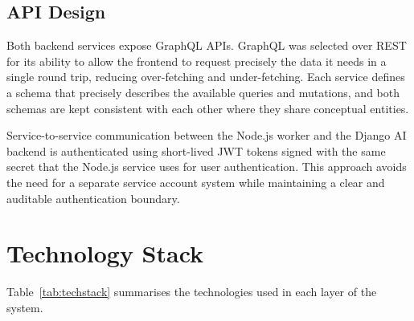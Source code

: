 \documentclass[12pt, a4paper]{report}
\begin{document}
\subsection{API Design}

Both backend services expose GraphQL APIs. GraphQL was selected over REST for its ability to allow the frontend to request precisely the data it needs in a single round trip, reducing over-fetching and under-fetching. Each service defines a schema that precisely describes the available queries and mutations, and both schemas are kept consistent with each other where they share conceptual entities.

Service-to-service communication between the Node.js worker and the Django AI backend is authenticated using short-lived JWT tokens signed with the same secret that the Node.js service uses for user authentication. This approach avoids the need for a separate service account system while maintaining a clear and auditable authentication boundary.

\section{Technology Stack}

Table~\ref{tab:techstack} summarises the technologies used in each layer of the system.
\end{document}

